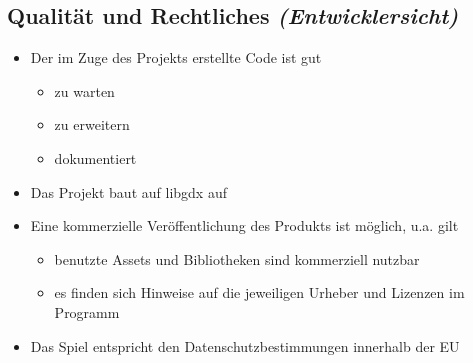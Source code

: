 \subsection{Qualität und Rechtliches \textit{(Entwicklersicht)}}
\begin{itemize}
	\item Der im Zuge des Projekts erstellte Code ist gut
		\begin{itemize}
			\item zu warten
			\item zu erweitern
			\item dokumentiert
		\end{itemize}
	\item Das Projekt baut auf libgdx auf
	\item Eine kommerzielle Veröffentlichung des Produkts ist möglich, u.a. gilt
		\begin{itemize}
			\item benutzte Assets und Bibliotheken sind kommerziell nutzbar
			\item es finden sich Hinweise auf die jeweiligen Urheber und Lizenzen im Programm
		\end{itemize}
	\item Das Spiel entspricht den Datenschutzbestimmungen innerhalb der EU
\end{itemize}
